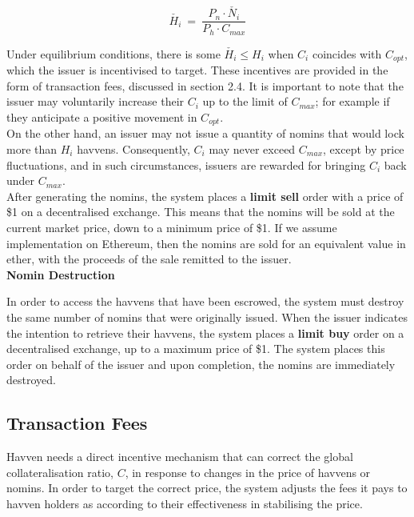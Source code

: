 \begin{equation}
\check{H_i} \ = \ \frac{P_n \cdot \check{N_i}}{P_h \cdot C_{max}}  \label{eq:escrowed}
\end{equation}

\vspace{2 mm}

\noindent Under equilibrium conditions, there is some $\check{H_i} \leq H_i$ when $C_i$ coincides with $C_{opt}$, which the issuer is incentivised to target. These incentives are provided in the form of transaction fees, discussed in section 2.4. It is important to note that the issuer may voluntarily increase their $C_i$ up to the limit of $C_{max}$; for example if they anticipate a positive movement in $C_{opt}$. \\

\noindent On the other hand, an issuer may not issue a quantity of nomins that would lock more than $H_i$ havvens.  Consequently, $C_i$ may never exceed $C_{max}$, except by price fluctuations, and in such circumstances, issuers are rewarded for bringing $C_i$ back under $C_{max}$. \\

\noindent After generating the nomins, the system places a \textbf{limit sell} order with a price
of \$1 on a decentralised exchange. This means that the nomins will be sold at the current market
price, down to a minimum price of \$1. If we assume implementation on Ethereum, then the nomins
are sold for an equivalent value in ether, with the proceeds of the sale remitted to the issuer. \\

\noindent \textbf{Nomin Destruction}

\vspace{1mm}

\noindent In order to access the havvens that have been escrowed, the system must destroy the
same number of nomins that were originally issued. When the issuer indicates the intention to
retrieve their havvens, the system places a \textbf{limit buy} order on a decentralised exchange,
up to a maximum price of \$1. The system places this order on behalf of the issuer and upon
completion, the nomins are immediately destroyed. \\

\newpage
\subsection{Transaction Fees}
Havven needs a direct incentive mechanism that can correct the global collateralisation
ratio, $C$, in response to changes in the price of havvens or nomins. In order to target
the correct price, the system adjusts the fees it pays to havven holders as according
to their effectiveness in stabilising the price.

